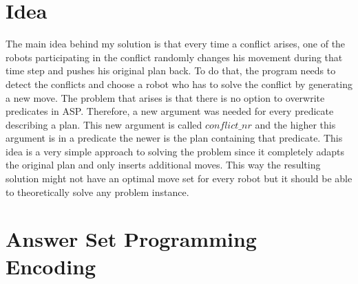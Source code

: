 \documentclass[runningheads]{llncs}
\begin{document}
\section{Idea}
The main idea behind my solution is that every time a conflict arises, one of the robots participating in the conflict randomly changes his movement during that time step and pushes his original plan back. 
To do that, the program needs to detect the conflicts and choose a robot who has to solve the conflict by generating a new move. The problem that arises is that
there is no option to overwrite predicates in ASP. Therefore, a new argument was needed for every predicate describing a plan. This new argument is called $conflict\_nr$ and 
the higher this argument is in a predicate the newer is the plan containing that predicate. This idea is a very simple approach to solving the problem since it completely adapts the original plan and only
inserts additional moves. This way the resulting solution might not have an optimal move set for every robot but it should be able to theoretically solve any problem instance.

\section{Answer Set Programming Encoding}
\end{document}
